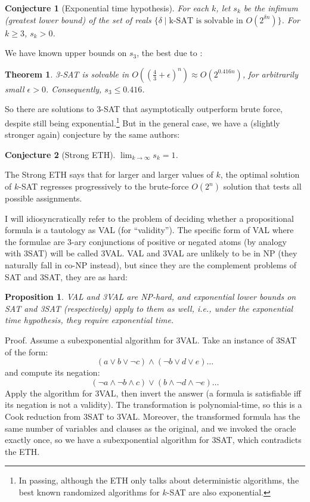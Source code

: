 \documentclass[letterpaper,12pt]{article}
\newtheorem{conjecture}{Conjecture}
\newtheorem{proposition}{Proposition}
\newtheorem{theorem}{Theorem}
\begin{document}
\begin{conjecture}[Exponential time hypothesis]
For each $k$, let $s_k$ be the infimum (greatest lower bound) of the set of reals $\{\delta \mid \text{k-SAT is solvable in } O(2^{\delta n})\}$. For $k \geq 3$, $s_k > 0$.
\end{conjecture}

We have known upper bounds on $s_3$, the best due to \cite{DBLP:journals/corr/abs-1008-4067}:

\begin{theorem}
\label{3SatBound}
3-SAT is solvable in $O((\frac{4}{3} + \epsilon)^{n}) \approx O(2^{0.416n})$, for arbitrarily small $\epsilon > 0$. Consequently, $s_3 \leq 0.416$.
\end{theorem}

So there are solutions to 3-SAT that asymptotically outperform brute force, despite still being exponential.\footnote{In passing, although the ETH only talks about deterministic algorithms, the best known randomized algorithms for $k$-SAT are also exponential.} But in the general case, we have a (slightly stronger again) conjecture by the same authors:

\begin{conjecture}[Strong ETH]
$\lim_{k \to \infty} s_k = 1$.
\end{conjecture}

The Strong ETH says that for larger and larger values of $k$, the optimal solution of $k$-SAT regresses progressively to the brute-force $O(2^n)$ solution that tests all possible assignments.

I will idiosyncratically refer to the problem of deciding whether a propositional formula is a tautology as VAL (for ``validity''). The specific form of VAL where the formulae are 3-ary conjunctions of positive or negated atoms (by analogy with 3SAT) will be called 3VAL. VAL and 3VAL are unlikely to be in NP (they naturally fall in co-NP instead), but since they are the complement problems of SAT and 3SAT, they are as hard:

\begin{proposition}
\label{3ValExpTime}
VAL and 3VAL are NP-hard, and exponential lower bounds on SAT and 3SAT (respectively) apply to them as well, i.e., under the exponential time hypothesis, they require exponential time.
\end{proposition}
Proof. Assume a subexponential algorithm for 3VAL. Take an instance of 3SAT of the form:
$$(a \lor b \lor \neg c) \land (\neg b \lor d \lor e) \ldots$$
and compute its negation:
$$(\neg a \land \neg b \land c) \lor (b \land \neg d \land \neg e) \ldots$$
Apply the algorithm for 3VAL, then invert the answer (a formula is satisfiable iff its negation is not a validity). The transformation is polynomial-time, so this is a Cook reduction from 3SAT to 3VAL. Moreover, the transformed formula has the same number of variables and clauses as the original, and we invoked the oracle exactly once, so we have a subexponential algorithm for 3SAT, which contradicts the ETH.
\end{document}
